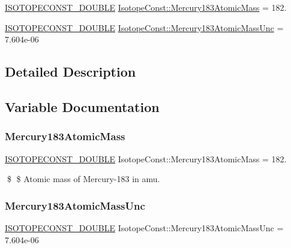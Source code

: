 \begin{DoxyCompactItemize}
\item 
\mbox{\hyperlink{group___isotope_const-_macros_ga8f45a7272ce02c0b4c65c44636ed719a}{I\+S\+O\+T\+O\+P\+E\+C\+O\+N\+S\+T\+\_\+\+D\+O\+U\+B\+LE}} \mbox{\hyperlink{group___isotope_const-_mercury-_hg183_ga28fb0335633bd049b72897735b1b8f81}{Isotope\+Const\+::\+Mercury183\+Atomic\+Mass}} = 182.
\item 
\mbox{\hyperlink{group___isotope_const-_macros_ga8f45a7272ce02c0b4c65c44636ed719a}{I\+S\+O\+T\+O\+P\+E\+C\+O\+N\+S\+T\+\_\+\+D\+O\+U\+B\+LE}} \mbox{\hyperlink{group___isotope_const-_mercury-_hg183_ga73a439bc8845d32760986027fda397a1}{Isotope\+Const\+::\+Mercury183\+Atomic\+Mass\+Unc}} = 7.\+604e-\/06
\end{DoxyCompactItemize}


\subsection{Detailed Description}


\subsection{Variable Documentation}
\mbox{\label{group___isotope_const-_mercury-_hg183_ga28fb0335633bd049b72897735b1b8f81}} 
\subsubsection{\texorpdfstring{Mercury183\+Atomic\+Mass}{Mercury183AtomicMass}}
{\footnotesize\ttfamily \mbox{\hyperlink{group___isotope_const-_macros_ga8f45a7272ce02c0b4c65c44636ed719a}{I\+S\+O\+T\+O\+P\+E\+C\+O\+N\+S\+T\+\_\+\+D\+O\+U\+B\+LE}} Isotope\+Const\+::\+Mercury183\+Atomic\+Mass = 182.}

\$ \$ Atomic mass of Mercury-\/183 in amu. \mbox{\label{group___isotope_const-_mercury-_hg183_ga73a439bc8845d32760986027fda397a1}} 
\subsubsection{\texorpdfstring{Mercury183\+Atomic\+Mass\+Unc}{Mercury183AtomicMassUnc}}
{\footnotesize\ttfamily \mbox{\hyperlink{group___isotope_const-_macros_ga8f45a7272ce02c0b4c65c44636ed719a}{I\+S\+O\+T\+O\+P\+E\+C\+O\+N\+S\+T\+\_\+\+D\+O\+U\+B\+LE}} Isotope\+Const\+::\+Mercury183\+Atomic\+Mass\+Unc = 7.\+604e-\/06}

